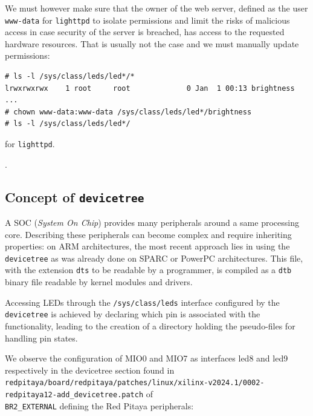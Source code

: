\documentclass{article}
\begin{document}
{We must however make sure that the owner of the web server, defined as the
user {\tt www-data} for {\tt lighttpd} to isolate permissions and limit the
risks of malicious access in case security of the server is breached, has access
to the requested hardware resources. That is usually not the case and we must
manually update permissions:
\begin{verbatim}
# ls -l /sys/class/leds/led*/*
lrwxrwxrwx    1 root     root             0 Jan  1 00:13 brightness
...
# chown www-data:www-data /sys/class/leds/led*/brightness
# ls -l /sys/class/leds/led*/
\end{verbatim} 
for {\tt lighttpd}.

.


\subsection{Concept of {\tt devicetree}}

A SOC ({\em System On Chip}) provides many peripherals around a same processing core.
Describing these peripherals can become complex and require inheriting properties: on
ARM architectures, the most recent approach lies in using the {\tt devicetree} as
was already done on SPARC or PowerPC architectures. This file, with the extension
{\tt dts} to be readable by a programmer, is compiled as a {\tt dtb} binary file readable
by kernel modules and drivers.

Accessing LEDs through the {\tt /sys/class/leds} interface configured by the
{\tt devicetree} is achieved by declaring which pin is associated with the functionality,
leading to the creation of a directory holding the pseudo-files for handling pin states.

We observe the configuration of MIO0 and MIO7 as interfaces led8 and led9 respectively
in the devicetree section found in {\tt redpitaya/board/redpitaya/patches/linux/xilinx-v2024.1/0002-redpitaya12-add\_devicetree.patch}
of \\ {\tt BR2\_EXTERNAL} defining the Red Pitaya peripherals:

}
\end{document}
